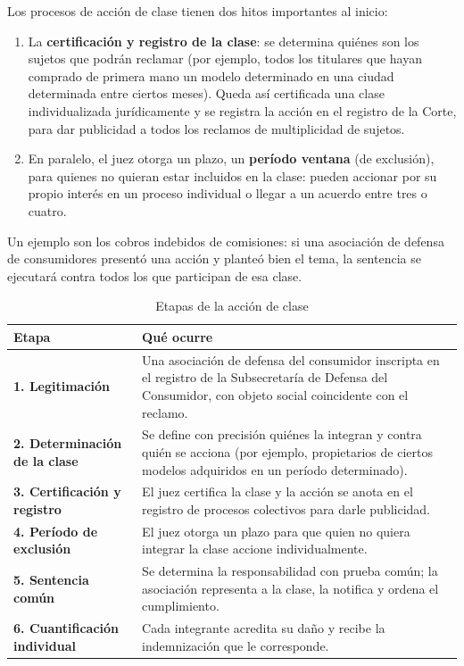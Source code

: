 \documentclass[12pt,oneside]{book}
\begin{document}
Los procesos de acción de clase tienen dos hitos importantes al inicio:

\begin{enumerate}
    \item La \textbf{certificación y registro de la clase}: se determina quiénes son los sujetos que podrán reclamar (por ejemplo, todos los titulares que hayan comprado de primera mano un modelo determinado en una ciudad determinada entre ciertos meses). Queda así certificada una clase individualizada jurídicamente y se registra la acción en el registro de la Corte, para dar publicidad a todos los reclamos de multiplicidad de sujetos.
    \item En paralelo, el juez otorga un plazo, un \textbf{período ventana} (de exclusión), para quienes no quieran estar incluidos en la clase: pueden accionar por su propio interés en un proceso individual o llegar a un acuerdo entre tres o cuatro.
\end{enumerate}

Un ejemplo son los cobros indebidos de comisiones: si una asociación de defensa de consumidores presentó una acción y planteó bien el tema, la sentencia se ejecutará contra todos los que participan de esa clase.

\begin{table}[H]
\centering
\caption{Etapas de la acción de clase}
\renewcommand{\arraystretch}{1.25}
\begin{tabularx}{\textwidth}{>{\raggedright\arraybackslash}p{} >{\raggedright\arraybackslash}X}
\toprule
\textbf{Etapa} & \textbf{Qué ocurre} \\
\midrule
\textbf{1. Legitimación} & Una asociación de defensa del consumidor inscripta en el registro de la Subsecretaría de Defensa del Consumidor, con objeto social coincidente con el reclamo. \\
\textbf{2. Determinación de la clase} & Se define con precisión quiénes la integran y contra quién se acciona (por ejemplo, propietarios de ciertos modelos adquiridos en un período determinado). \\
\textbf{3. Certificación y registro} & El juez certifica la clase y la acción se anota en el registro de procesos colectivos para darle publicidad. \\
\textbf{4. Período de exclusión} & El juez otorga un plazo para que quien no quiera integrar la clase accione individualmente. \\
\textbf{5. Sentencia común} & Se determina la responsabilidad con prueba común; la asociación representa a la clase, la notifica y ordena el cumplimiento. \\
\textbf{6. Cuantificación individual} & Cada integrante acredita su daño y recibe la indemnización que le corresponde. \\
\bottomrule
\end{tabularx}
\end{table}
\end{document}
